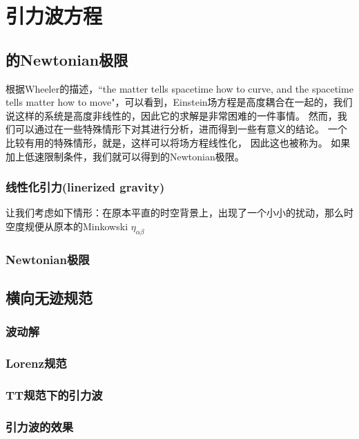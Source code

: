 
\chapter{引力波方程}
\label{chap2}

\section{\GR 的Newtonian极限}
根据Wheeler的描述，``the matter tells spacetime how to curve, and the spacetime tells matter how to move"，可以看到，Einstein场方程是高度耦合在一起的，我们说这样的系统是高度非线性的，因此它的求解是非常困难的一件事情。
然而，我们可以通过在一些特殊情形下对其进行分析，进而得到一些有意义的结论。
一个比较有用的特殊情形，就是{}，这样可以将场方程线性化， 因此这也被称为{}。
如果加上低速限制条件，我们就可以得到\GR 的Newtonian极限。

\subsection{线性化引力(linerized gravity)}
让我们考虑如下情形：在原本平直的时空背景上，出现了一个小小的扰动，那么时空度规便从原本的Minkowski $\eta_{\alpha\beta}$

\subsection{Newtonian极限}

\section{横向无迹规范}

\subsection{波动解}

\subsection{Lorenz规范}

\subsection{TT规范下的引力波}

\subsection{引力波的效果}
